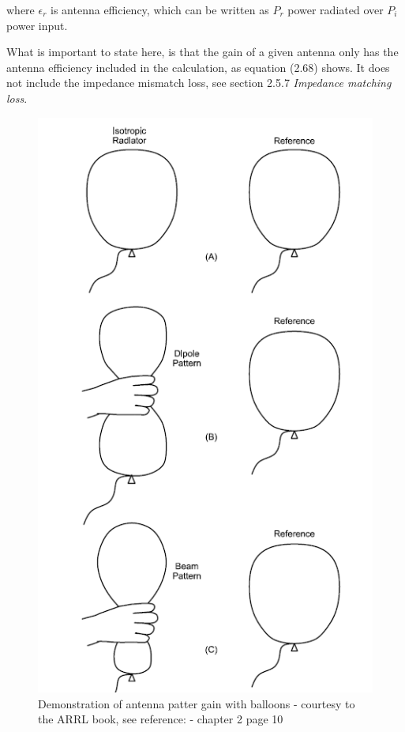 where $\epsilon_r$ is antenna efficiency, which can be written as $P_r$ power radiated over $P_i$ power input.

What is important to state here, is that the gain of a given antenna only has the antenna efficiency included in the calculation, as equation (2.68) shows. It does not include the impedance mismatch loss, see section 2.5.7 \textit{Impedance matching loss}.  


\begin{figure}[h]
\centering
\includegraphics[scale=0.8]{figures/BalloonDirectivity.PNG}
\caption{Demonstration of antenna patter gain with balloons - courtesy to the ARRL book, see reference: \cite{ARRL} - chapter 2 page 10}
\end{figure}

